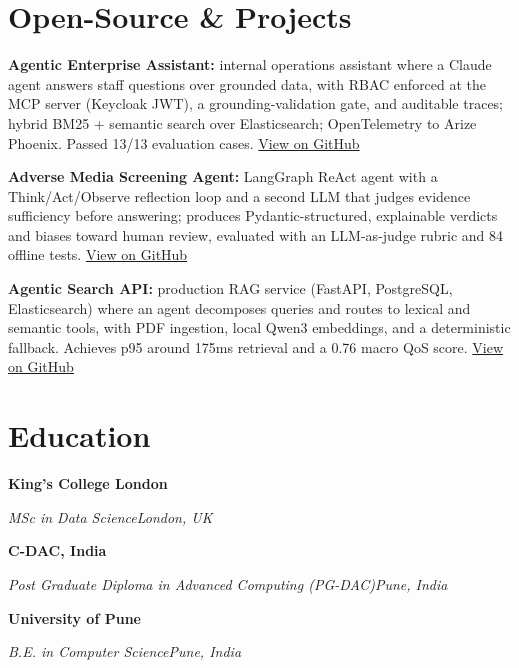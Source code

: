 \documentclass[10pt,a4paper]{article}
\newcommand{\entry}[4]{%
  {\color{company}\bfseries #1}\hfill {\color{muted}#2}\par
  \vspace{1pt}
  {\itshape #3}\hfill {\color{muted}\itshape #4}\par
  \vspace{3pt}%
}
\begin{document}
\section{Open-Source \& Projects}
\begin{tight}
  \item \textbf{Agentic Enterprise Assistant:} internal operations assistant where a Claude agent answers staff questions over grounded data, with RBAC enforced at the MCP server (Keycloak JWT), a grounding-validation gate, and auditable traces; hybrid BM25 + semantic search over Elasticsearch; OpenTelemetry to Arize Phoenix. Passed 13/13 evaluation cases. \href{https://github.com/abhijeetscode/Agentic-Enterprise-Assistant}{View on GitHub}
  \item \textbf{Adverse Media Screening Agent:} LangGraph ReAct agent with a Think/Act/Observe reflection loop and a second LLM that judges evidence sufficiency before answering; produces Pydantic-structured, explainable verdicts and biases toward human review, evaluated with an LLM-as-judge rubric and 84 offline tests. \href{https://github.com/abhijeetscode/adverse-media-screening}{View on GitHub}
  \item \textbf{Agentic Search API:} production RAG service (FastAPI, PostgreSQL, Elasticsearch) where an agent decomposes queries and routes to lexical and semantic tools, with PDF ingestion, local Qwen3 embeddings, and a deterministic fallback. Achieves p95 around 175ms retrieval and a 0.76 macro QoS score. \href{https://github.com/abhijeetscode/search-agent}{View on GitHub}
\end{tight}

\section{Education}
\entry{King's College London}{}{MSc in Data Science}{London, UK}
\vspace{-3pt}
\entry{C-DAC, India}{}{Post Graduate Diploma in Advanced Computing (PG-DAC)}{Pune, India}
\vspace{-3pt}
\entry{University of Pune}{}{B.E. in Computer Science}{Pune, India}
\end{document}
